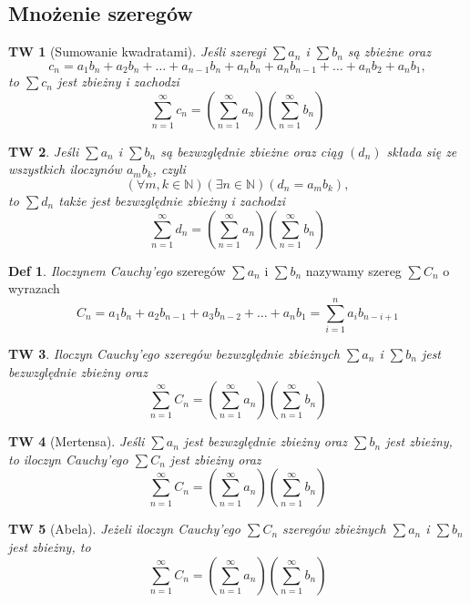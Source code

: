 \documentclass[a4paper, 12pt]{mwart}
\theoremstyle{definition}
\newtheorem{definicja}{Def}[section]
\theoremstyle{plain}
\newtheorem{twierdzenie}{TW}[section]
\theoremstyle{remark}
\begin{document}
\subsection{Mnożenie szeregów}
\begin{twierdzenie}[Sumowanie kwadratami]
	Jeśli szeregi $\sum a_n$ i $\sum b_n$ są zbieżne oraz
	\begin{equation}
		c_n = a_1b_n + a_2b_n + \ldots + a_{n-1}b_n + a_nb_n + a_nb_{n-1} + \ldots + a_nb_2 + a_nb_1,
 	\end{equation}
	to $\sum c_n$ jest zbieżny i zachodzi
	\begin{equation}
		\sum_{n=1}^\infty c_n = \left(\sum_{n=1}^\infty a_n\right)\left(\sum_{n=1}^\infty b_n\right)
	\end{equation}
\end{twierdzenie}
\begin{twierdzenie}
	Jeśli $\sum a_n$ i $\sum b_n$ są bezwzględnie zbieżne oraz ciąg $(d_n)$ składa się ze wszystkich iloczynów $a_mb_k$, czyli
	\begin{equation}
		(\forall m,k\in\mathbb{N})(\exists n\in\mathbb{N})(d_n = a_mb_k),
	\end{equation}
	to $\sum d_n$ także jest bezwzględnie zbieżny i zachodzi
	\begin{equation}
		\sum_{n=1}^{\infty} d_n = \left(\sum_{n=1}^\infty a_n\right)\left(\sum_{n=1}^\infty b_n\right)
	\end{equation}
\end{twierdzenie}
\begin{definicja}
	\emph{Iloczynem Cauchy'ego} szeregów $\sum a_n$ i $\sum b_n$ nazywamy szereg $\sum C_n$ o wyrazach
	\begin{equation}
		C_n = a_1b_n + a_2b_{n-1} + a_3b_{n-2} + \ldots + a_nb_1 = \sum_{i = 1}^n a_ib_{n-i+1}
	\end{equation}
\end{definicja}
\begin{twierdzenie}
	Iloczyn Cauchy'ego szeregów bezwzględnie zbieżnych $\sum a_n$ i $\sum b_n$ jest bezwzględnie zbieżny oraz
	\begin{equation}
		\sum_{n=1}^{\infty} C_n = \left(\sum_{n=1}^\infty a_n\right)\left(\sum_{n=1}^\infty b_n\right)
	\end{equation}
\end{twierdzenie}
\begin{twierdzenie}[Mertensa]
	Jeśli $\sum a_n$ jest bezwzględnie zbieżny oraz $\sum b_n$ jest zbieżny, to iloczyn Cauchy'ego $\sum C_n$ jest zbieżny oraz
	\begin{equation}
		\sum_{n=1}^{\infty} C_n = \left(\sum_{n=1}^\infty a_n\right)\left(\sum_{n=1}^\infty b_n\right)
	\end{equation}
\end{twierdzenie}
\begin{twierdzenie}[Abela]
	Jeżeli iloczyn Cauchy'ego $\sum C_n$ szeregów zbieżnych $\sum a_n$ i $\sum b_n$ jest zbieżny, to
	\begin{equation}
		\sum_{n=1}^{\infty} C_n = \left(\sum_{n=1}^\infty a_n\right)\left(\sum_{n=1}^\infty b_n\right)
	\end{equation}
\end{twierdzenie}
\end{document}
